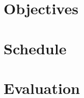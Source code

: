 \documentclass[a4paper,10pt]{article}
\begin{document}
\section{Objectives}


\section{Schedule}


\section{Evaluation}


\end{document}
